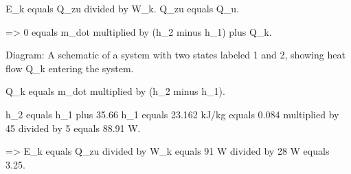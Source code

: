 E_k equals Q_zu divided by W_k.  
Q_zu equals Q_u.  

=> 0 equals m_dot multiplied by (h_2 minus h_1) plus Q_k.  

Diagram: A schematic of a system with two states labeled 1 and 2, showing heat flow Q_k entering the system.  

Q_k equals m_dot multiplied by (h_2 minus h_1).  

h_2 equals h_1 plus 35.66%
h_1 equals 23.162 kJ/kg equals 0.084 multiplied by 45 divided by 5 equals 88.91 W.  

=> E_k equals Q_zu divided by W_k equals 91 W divided by 28 W equals 3.25.